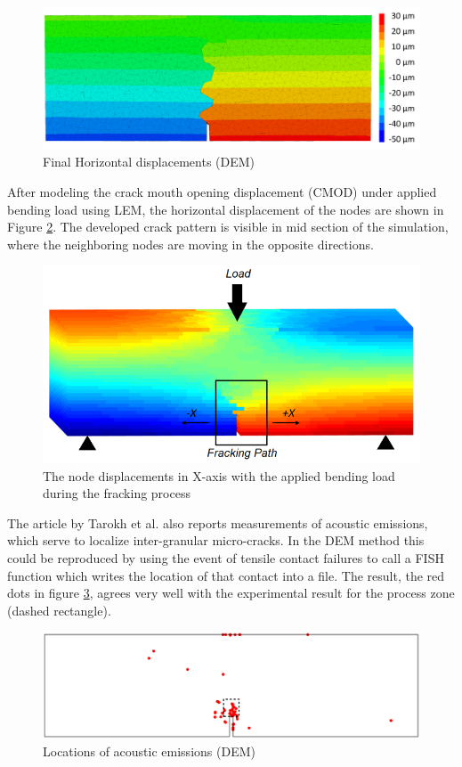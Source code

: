 \begin{figure}[!ht]
\centering
\includegraphics[width=1\textwidth]{figures/ME1-xdis-dem}
\caption{Final Horizontal displacements (DEM)}
\label{fig:ME1-xdis-dem}
\end{figure}

After modeling the crack mouth opening displacement (CMOD) under applied bending load using LEM, the horizontal displacement of the nodes are shown in Figure \ref{fig:Amir_ME1_LEM_Displacement_Crystalline}. The developed crack pattern is visible in mid section of the simulation, where the neighboring nodes are moving in the opposite directions. 

\begin{figure}[!ht]
\centering
\includegraphics[width=1\textwidth]{figures/Amir_ME1_LEM_Displacement_Crystalline.png}
\caption{The node displacements in X-axis with the applied bending load during the fracking process}
\label{fig:Amir_ME1_LEM_Displacement_Crystalline}
\end{figure}

The article by Tarokh et al. also reports measurements of acoustic emissions, which serve to localize inter-granular micro-cracks. In the DEM method this could be 
reproduced by using the event of tensile contact failures to call a FISH function which writes the location of that contact into a file. The result, the red dots in 
figure \ref{fig:ME1-dem-ae}, agrees very well with the experimental result for the process zone (dashed rectangle).

\begin{figure}[!ht]
\centering
\includegraphics[width=1\textwidth]{figures/sample1-ae-tillmax-v2}
\caption{Locations of acoustic emissions (DEM)}
\label{fig:ME1-dem-ae}
\end{figure}

